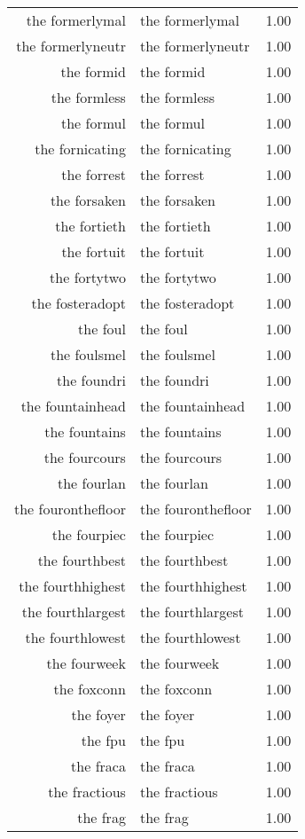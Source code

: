 \begin{table}[ht]
\begin{tabular}{rlr}
  the formerlymal & the formerlymal & 1.00 \\ 
  the formerlyneutr & the formerlyneutr & 1.00 \\ 
  the formid & the formid & 1.00 \\ 
  the formless & the formless & 1.00 \\ 
  the formul & the formul & 1.00 \\ 
  the fornicating & the fornicating & 1.00 \\ 
  the forrest & the forrest & 1.00 \\ 
  the forsaken & the forsaken & 1.00 \\ 
  the fortieth & the fortieth & 1.00 \\ 
  the fortuit & the fortuit & 1.00 \\ 
  the fortytwo & the fortytwo & 1.00 \\ 
  the fosteradopt & the fosteradopt & 1.00 \\ 
  the foul & the foul & 1.00 \\ 
  the foulsmel & the foulsmel & 1.00 \\ 
  the foundri & the foundri & 1.00 \\ 
  the fountainhead & the fountainhead & 1.00 \\ 
  the fountains & the fountains & 1.00 \\ 
  the fourcours & the fourcours & 1.00 \\ 
  the fourlan & the fourlan & 1.00 \\ 
  the fouronthefloor & the fouronthefloor & 1.00 \\ 
  the fourpiec & the fourpiec & 1.00 \\ 
  the fourthbest & the fourthbest & 1.00 \\ 
  the fourthhighest & the fourthhighest & 1.00 \\ 
  the fourthlargest & the fourthlargest & 1.00 \\ 
  the fourthlowest & the fourthlowest & 1.00 \\ 
  the fourweek & the fourweek & 1.00 \\ 
  the foxconn & the foxconn & 1.00 \\ 
  the foyer & the foyer & 1.00 \\ 
  the fpu & the fpu & 1.00 \\ 
  the fraca & the fraca & 1.00 \\ 
  the fractious & the fractious & 1.00 \\ 
  the frag & the frag & 1.00 \\ 

\end{tabular}
\end{table}
